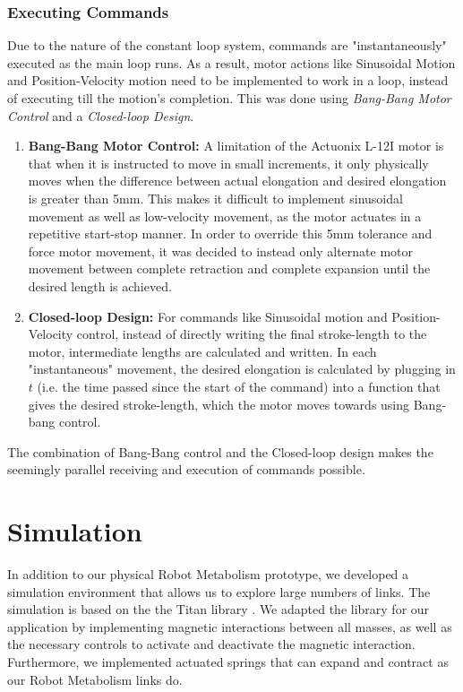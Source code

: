 \documentclass[letterpaper, 10 pt, conference]{ieeeconf}  %
\begin{document}
\subsubsection{Executing Commands}
Due to the nature of the constant loop system, commands are "instantaneously" executed as the main loop runs. As a result, motor actions like Sinusoidal Motion and Position-Velocity motion need to be implemented to work in a loop, instead of executing till the motion's completion. This was done using \textit{Bang-Bang Motor Control} and a \textit{Closed-loop Design}.

\begin{enumerate}
    \item \textbf{Bang-Bang Motor Control:} A limitation of the Actuonix L-12I motor is that when it is instructed to move in small increments, it only physically moves when the difference between actual elongation and desired elongation is greater than 5mm. This makes it difficult to implement sinusoidal movement as well as low-velocity movement, as the motor actuates in a repetitive start-stop manner. In order to override this 5mm tolerance and force motor movement, it was decided to instead only alternate motor movement between complete retraction and complete expansion until the desired length is achieved.
    \item \textbf{Closed-loop Design:} For commands like Sinusoidal motion and Position-Velocity control, instead of directly writing the final stroke-length to the motor, intermediate lengths are calculated and written. In each "instantaneous" movement, the desired elongation is calculated by plugging in $t$ (i.e. the time passed since the start of the command) into a function that gives the desired stroke-length, which the motor moves towards using Bang-bang control.
\end{enumerate}

The combination of Bang-Bang control and the Closed-loop design makes the seemingly parallel receiving and execution of commands possible.

\section{Simulation}
In addition to our physical Robot Metabolism prototype, we developed a simulation environment that allows us to explore large numbers of links. The simulation is based on the the Titan library \cite{TitanICRA}. We adapted the library for our application by implementing magnetic interactions between all masses, as well as the necessary controls to activate and deactivate the magnetic interaction. Furthermore, we implemented actuated springs that can expand and contract as our Robot Metabolism links do.
\end{document}

